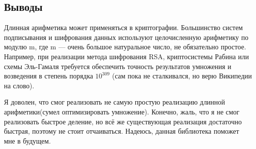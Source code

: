 \documentclass[12pt]{article}
\begin{document}
	\subsection*{Выводы}
	
	Длинная арифметика может применяться в криптографии. Большинство систем подписывания и шифрования данных используют целочисленную арифметику по модулю m, где m — очень большое натуральное число, не обязательно простое. Например, при реализации метода шифрования RSA, криптосистемы Рабина или схемы Эль-Гамаля требуется обеспечить точность результатов умножения и возведения в степень порядка $10^{309}$ (сам пока не сталкивался, но верю Википедии на слово).
	
	Я доволен, что смог реализовать не самую простую реализацию длинной арифметики(сумел оптимизировать умножение). Конечно, жаль, что я не смог реализовать быстрое деление, но всё же существующая реализация достаточно быстрая, поэтому не стоит отчаиваться. Надеюсь, данная библиотека поможет мне в будущем.
\end{document}
